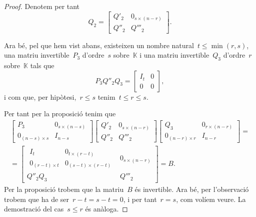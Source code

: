 \documentclass[../../main.tex]{subfiles}
\begin{document}
\begin{theorem}
\begin{proof}
            Denotem per tant
            \[Q_{2}=\left[\begin{array}{c|c}
            Q'_{2} & 0_{s\times(n-r)} \\\hline
            Q''_{2} & Q'''_{2}
            \end{array}\right].\]

            Ara bé, pel que hem vist abans, existeixen un nombre natural~\(t\leq\min(r,s)\), una matriu invertible~\(P_{3}\) d'ordre~\(s\) sobre~\(\mathbb{K}\) i una matriu invertible~\(Q_{3}\) d'ordre~\(r\) sobre~\(\mathbb{K}\) tals que
            \[P_{3}Q''_{2}Q_{3}=\left[\begin{array}{c|c}
            I_{t} & 0 \\\hline
            0 & 0
            \end{array}\right],\]
            i com que, per hipòtesi,~\(r\leq s\) tenim~\(t\leq r\leq s\).

            Per tant per la proposició  tenim que
            \begin{multline*}
            \left[\begin{array}{c|c}
            P_{3} & 0_{s\times(n-s)} \\\hline
            0_{(n-s)\times s} & I_{n-s}
            \end{array}\right]
            \left[\begin{array}{c|c}
            Q'_{2} & 0_{s\times(n-r)} \\\hline
            Q''_{2} & Q'''_{2}
            \end{array}\right]
            \left[\begin{array}{c|c}
            Q_{3} & 0_{r\times(n-r)} \\\hline
            0_{(n-r)\times r} & I_{n-r}
            \end{array}\right]=\\=
            \left[\begin{array}{c|c}
                \begin{array}{c|c}
                I_{t} & 0_{t\times(r-t)} \\\hline
                0_{(r-t)\times t} & 0_{(s-t)\times(r-t)}
                \end{array}
            & 0_{s\times(n-r)} \\\hline
            Q''_{2}Q_{3} & Q'''_{2}
            \end{array}\right]=B.
            \end{multline*}
            Per la proposició  trobem que la matriu~\(B\) és invertible.
            Ara bé, per l'observació  trobem que ha de ser~\(r-t=s-t=0\), i per tant~\(r=s\), com volíem veure.
            La demostració del cas~\(s\leq r\) és anàloga.
        \end{proof}
    \end{theorem}
\end{document}
